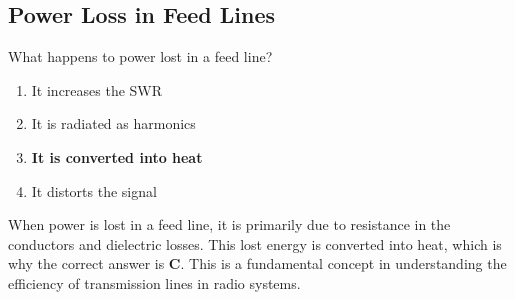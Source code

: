 \subsection{Power Loss in Feed Lines}
\label{T7C07}

\begin{tcolorbox}[colback=gray!10!white,colframe=black!75!black,title=T7C07]
What happens to power lost in a feed line?
\begin{enumerate}[noitemsep]
    \item It increases the SWR
    \item It is radiated as harmonics
    \item \textbf{It is converted into heat}
    \item It distorts the signal
\end{enumerate}
\end{tcolorbox}

When power is lost in a feed line, it is primarily due to resistance in the conductors and dielectric losses. This lost energy is converted into heat, which is why the correct answer is \textbf{C}. This is a fundamental concept in understanding the efficiency of transmission lines in radio systems.